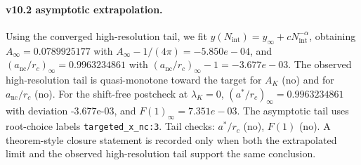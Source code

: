 \paragraph{v10.2 asymptotic extrapolation.}
Using the converged high-resolution tail, we fit $y(N_{\mathrm{int}})=y_{\infty}+cN_{\mathrm{int}}^{-\alpha}$, obtaining $A_\infty=0.0789925177$ with $A_\infty-1/(4\pi)=-5.850e-04$, and $(a_{\mathrm{nc}}/r_c)_\infty=0.9963234861$ with $(a_{\mathrm{nc}}/r_c)_\infty-1=-3.677e-03$. The observed high-resolution tail is quasi-monotone toward the target for $A_K$ (no) and for $a_{\mathrm{nc}}/r_c$ (no). For the shift-free postcheck at $\lambda_K=0$, $(a^*/r_c)_\infty=0.9963234861$ with deviation -3.677e-03, and $F(1)_\infty=7.351e-03$. The asymptotic tail uses root-choice labels \texttt{targeted_x_nc:3}. Tail checks: $a^*/r_c$ (no), $F(1)$ (no). A theorem-style closure statement is recorded only when both the extrapolated limit and the
observed high-resolution tail support the same conclusion.
